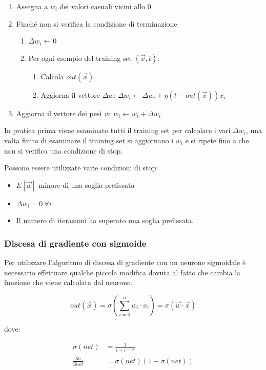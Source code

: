\begin{enumerate}
\item Assegna a $w_i$ dei valori casuali vicini allo 0
\item Finché non si verifica la condizione di terminazione
	\begin{enumerate}
	\item $\Delta w_i \leftarrow 0$
	\item Per ogni esempio del training set $(\vec{x},t)$:
		\begin{enumerate}
		\item Calcola $out(\vec{x})$
		\item Aggiorna il vettore $\Delta w$:  $\Delta w_i \leftarrow \Delta w_i + \eta (t - out(\vec{x}))x_i$
		\end{enumerate}
	\end{enumerate}
	\item Aggiorna il vettore dei pesi \textit{w}: $w_i \leftarrow w_i + \Delta w_i$
\end{enumerate}

In pratica prima viene esaminato tutti il training set per calcolare i
vari $\Delta w_i$, una volta finito di esaminare il training set si
aggiornano i $w_i$ e si ripete fino a che non si verifica una
condizione di stop.

Possono essere utilizzate varie condizioni di stop:

\begin{itemize}
\item
  $E[\vec{w}]$ minore di una soglia prefissata
\item
  $\Delta w_i = 0 \: \forall i$
\item
  Il numero di iterazioni ha superato una soglia prefissata.
\end{itemize}

\subsubsection{Discesa di gradiente con sigmoide}\label{discesa-di-gradiente-con-sigmoide}

Per utilizzare l'algoritmo di discesa di gradiente con un neurone sigmoidale è necessario effettuare qualche piccola modifica dovuta al fatto che cambia la funzione che viene calcolata dal neurone.

$$
out(\vec{x}) = \sigma (\sum\limits_{i = 0}^n w_i \cdot x_i ) = \sigma(\vec{w} \cdot \vec{x})
$$

dove:

\begin{align*}
\sigma(net) &= \frac{1}{1 + e^{-net}} \\
\frac{\partial \sigma}{\partial net} &= \sigma(net)(1-\sigma(net))
\end{align*}

